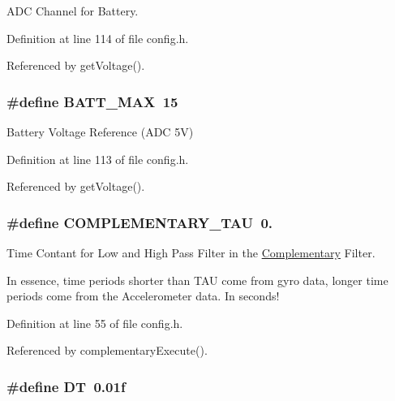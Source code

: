 A\-D\-C Channel for Battery. 



Definition at line 114 of file config.\-h.



Referenced by get\-Voltage().

\hypertarget{group__config_gac873c87f494ea2b22e7eb5fc74ad5a82}{
\subsubsection[{B\-A\-T\-T\-\_\-\-M\-A\-X}]{\setlength{\rightskip}{0pt plus 5cm}\#define B\-A\-T\-T\-\_\-\-M\-A\-X~15}}\label{group__config_gac873c87f494ea2b22e7eb5fc74ad5a82}


Battery Voltage Reference (A\-D\-C 5\-V) 



Definition at line 113 of file config.\-h.



Referenced by get\-Voltage().

\hypertarget{group__config_ga61cd22949cc88bd899de6b20cb61e959}{
\subsubsection[{C\-O\-M\-P\-L\-E\-M\-E\-N\-T\-A\-R\-Y\-\_\-\-T\-A\-U}]{\setlength{\rightskip}{0pt plus 5cm}\#define C\-O\-M\-P\-L\-E\-M\-E\-N\-T\-A\-R\-Y\-\_\-\-T\-A\-U~0.}}\label{group__config_ga61cd22949cc88bd899de6b20cb61e959}


Time Contant for Low and High Pass Filter in the \hyperlink{struct_complementary}{Complementary} Filter. 

In essence, time periods shorter than T\-A\-U come from gyro data, longer time periods come from the Accelerometer data. In seconds! 

Definition at line 55 of file config.\-h.



Referenced by complementary\-Execute().

\hypertarget{group__config_ga943f07034774ef1261d62cd0d3d1fec9}{
\subsubsection[{D\-T}]{\setlength{\rightskip}{0pt plus 5cm}\#define D\-T~0.\-01f}}\label{group__config_ga943f07034774ef1261d62cd0d3d1fec9}


